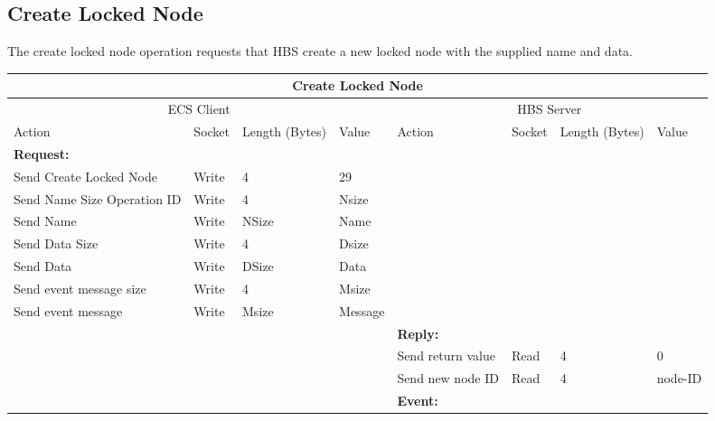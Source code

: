 \normalsize
\bigskip




\newpage
\subsection{Create Locked Node}

The create locked node operation requests that HBS create
a new locked node with the supplied name and data.

\bigskip
\small
\begin{tabular}{|p{1.2in}|p{.4in}|p{.4in}|p{.5in}|p{1.2in}|p{.4in}|p{.4in}|p{.5in} |} \hline
\multicolumn{8}{|c|}{{\bf Create Locked Node}} \\ \hline
\multicolumn{4}{|c|}{ECS Client} & \multicolumn{4}{|c|}{HBS Server} \\ \hline
Action            & Socket & Length  
                            (Bytes)& Value & Action       & Socket & Length 
                                                                    (Bytes)& Value \\ \hline
\multicolumn{4}{|l}{{\bf Request:}}&\multicolumn{4}{|l|}{~} \\ \hline
Send Create Locked Node & Write  & 4     & 29    &              &        &       &       \\ \hline
Send Name Size Operation ID   & Write  & 4     &  Nsize &        &        &       &       \\ \hline
Send Name         & Write  &  NSize &  Name &   &        &       &       \\ \hline
Send Data Size    & Write  & 4     &  Dsize &        &        &       &       \\ \hline
Send Data         & Write  &  DSize &  Data &   &        &       &       \\ \hline
Send event
message size      & Write  & 4     &  Msize &         &        &       &       \\ \hline
Send event message
                  & Write  &  Msize  &  Message &     &        &       &       \\ \hline
\multicolumn{4}{|l}{~}&\multicolumn{4}{|l|}{{\bf Reply:}} \\ \hline
                  &        &       &       & Send return
                                             value        & Read   &  4    & 0      \\ \hline
                  &        &       &       & Send new node ID & Read &  4    &  node-ID \\ \hline
\multicolumn{4}{|l}{~}&\multicolumn{4}{|l|}{{\bf Event:}} \\ \hline

\end{tabular}
